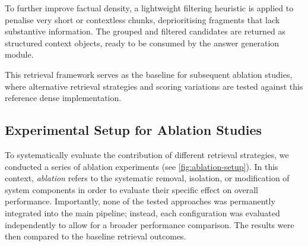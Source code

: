 \begin{spacing}{1.5}
To further improve factual density, a lightweight filtering heuristic is applied to penalise very short or contextless chunks, deprioritising fragments that lack substantive information. The grouped and filtered candidates are returned as structured context objects, ready to be consumed by the answer generation module. 

This retrieval framework serves as the baseline for subsequent ablation studies, where alternative retrieval strategies and scoring variations are tested against this reference dense implementation.

\subsection{Experimental Setup for Ablation Studies}\label{sec:exp_ablation}
To systematically evaluate the contribution of different retrieval strategies, we conducted a series of ablation experiments (see \autoref{fig:ablation-setup}). In this context, \textit{ablation} refers to the systematic removal, isolation, or modification of system components in order to evaluate their specific effect on overall performance. Importantly, none of the tested approaches was permanently integrated into the main pipeline; instead, each configuration was evaluated independently to allow for a broader performance comparison. The results were then compared to the baseline retrieval outcomes.\\


\end{spacing}
